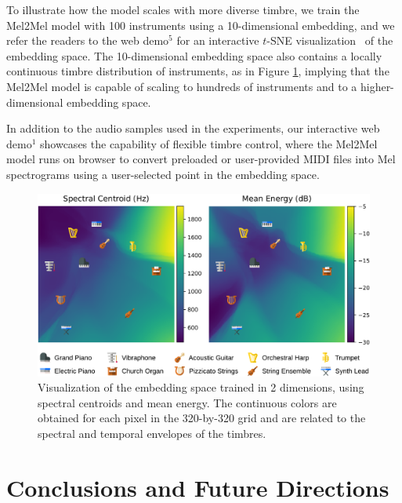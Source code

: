 To illustrate how the model scales with more diverse timbre, we train the Mel2Mel model with 100 instruments using a 10-dimensional embedding, and we refer the readers to the web demo$^\textrm{5}$ for an interactive $t$-SNE visualization~\cite{maaten2008tsne} of the embedding space.
The 10-dimensional embedding space also contains a locally continuous timbre distribution of instruments, as in Figure \ref{fig:embedding}, implying that the Mel2Mel model is capable of scaling to hundreds of instruments and to a higher-dimensional embedding space.

In addition to the audio samples used in the experiments, our interactive web demo$^\textrm{1}$ %
showcases the capability of flexible timbre control, where the Mel2Mel model runs on browser to convert preloaded or user-provided MIDI files into Mel spectrograms using a user-selected point in the embedding space.

\begin{figure}[t]
	\centering
	\includegraphics[width=\columnwidth]{runpixels.pdf}
	\caption{Visualization of the embedding space trained in 2 dimensions, using spectral centroids and mean energy. The continuous colors are obtained for each pixel in the 320-by-320 grid and are related to the spectral and temporal envelopes of the timbres.}
	\label{fig:embedding}
	\vspace{-1em}
\end{figure}


\section{Conclusions and Future Directions}\label{sec:conclusions}

